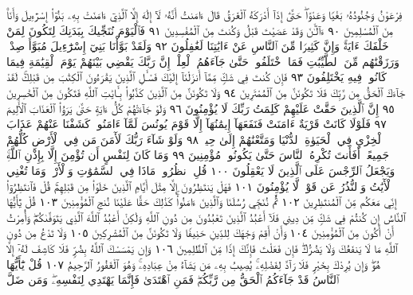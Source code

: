 فِرْعَوْنُ وَجُنُودُهُۥ بَغْيࣰا وَعَدْوًاۖ حَتَّىٰٓ إِذَآ أَدْرَكَهُ ٱلْغَرَقُ
قَالَ ءَامَنتُ أَنَّهُۥ لَآ إِلَٰهَ إِلَّا ٱلَّذِيٓ ءَامَنَتْ بِهِۦ بَنُوٓا۟ إِسْرَٰٓءِيلَ
وَأَنَا۠ مِنَ ٱلْمُسْلِمِينَ ٩٠ ءَآلْـَٰٔنَ وَقَدْ عَصَيْتَ قَبْلُ وَكُنتَ
مِنَ ٱلْمُفْسِدِينَ ٩١ فَٱلْيَوْمَ نُنَجِّيكَ بِبَدَنِكَ لِتَكُونَ لِمَنْ
خَلْفَكَ ءَايَةࣰۚ وَإِنَّ كَثِيرࣰا مِّنَ ٱلنَّاسِ عَنْ ءَايَٰتِنَا لَغَٰفِلُونَ ٩٢
وَلَقَدْ بَوَّأْنَا بَنِيٓ إِسْرَٰٓءِيلَ مُبَوَّأَ صِدْقࣲ وَرَزَقْنَٰهُم مِّنَ
ٱلطَّيِّبَٰتِ فَمَا ٱخْتَلَفُوا۟ حَتَّىٰ جَآءَهُمُ ٱلْعِلْمُۚ إِنَّ رَبَّكَ يَقْضِي
بَيْنَهُمْ يَوْمَ ٱلْقِيَٰمَةِ فِيمَا كَانُوا۟ فِيهِ يَخْتَلِفُونَ ٩٣ فَإِن كُنتَ فِي شَكࣲّ
مِّمَّآ أَنزَلْنَآ إِلَيْكَ فَسْـَٔلِ ٱلَّذِينَ يَقْرَءُونَ ٱلْكِتَٰبَ مِن
قَبْلِكَۚ لَقَدْ جَآءَكَ ٱلْحَقُّ مِن رَّبِّكَ فَلَا تَكُونَنَّ مِنَ ٱلْمُمْتَرِينَ ٩٤
وَلَا تَكُونَنَّ مِنَ ٱلَّذِينَ كَذَّبُوا۟ بِـَٔايَٰتِ ٱللَّهِ فَتَكُونَ مِنَ ٱلْخَٰسِرِينَ ٩٥
إِنَّ ٱلَّذِينَ حَقَّتْ عَلَيْهِمْ كَلِمَتُ رَبِّكَ لَا يُؤْمِنُونَ ٩٦
وَلَوْ جَآءَتْهُمْ كُلُّ ءَايَةٍ حَتَّىٰ يَرَوُا۟ ٱلْعَذَابَ ٱلْأَلِيمَ ٩٧
فَلَوْلَا كَانَتْ قَرْيَةٌ ءَامَنَتْ فَنَفَعَهَآ إِيمَٰنُهَآ إِلَّا قَوْمَ يُونُسَ
لَمَّآ ءَامَنُوا۟ كَشَفْنَا عَنْهُمْ عَذَابَ ٱلْخِزْيِ فِي ٱلْحَيَوٰةِ ٱلدُّنْيَا
وَمَتَّعْنَٰهُمْ إِلَىٰ حِينࣲ ٩٨ وَلَوْ شَآءَ رَبُّكَ لَأٓمَنَ مَن فِي ٱلْأَرْضِ
كُلُّهُمْ جَمِيعًاۚ أَفَأَنتَ تُكْرِهُ ٱلنَّاسَ حَتَّىٰ يَكُونُوا۟ مُؤْمِنِينَ ٩٩
وَمَا كَانَ لِنَفْسٍ أَن تُؤْمِنَ إِلَّا بِإِذْنِ ٱللَّهِۚ وَيَجْعَلُ ٱلرِّجْسَ
عَلَى ٱلَّذِينَ لَا يَعْقِلُونَ ١٠٠ قُلِ ٱنظُرُوا۟ مَاذَا فِي ٱلسَّمَٰوَٰتِ
وَٱلْأَرْضِۚ وَمَا تُغْنِي ٱلْأٓيَٰتُ وَٱلنُّذُرُ عَن قَوْمࣲ لَّا يُؤْمِنُونَ ١٠١
فَهَلْ يَنتَظِرُونَ إِلَّا مِثْلَ أَيَّامِ ٱلَّذِينَ خَلَوْا۟ مِن قَبْلِهِمْۚ
قُلْ فَٱنتَظِرُوٓا۟ إِنِّي مَعَكُم مِّنَ ٱلْمُنتَظِرِينَ ١٠٢ ثُمَّ نُنَجِّي
رُسُلَنَا وَٱلَّذِينَ ءَامَنُوا۟ۚ كَذَٰلِكَ حَقًّا عَلَيْنَا نُنجِ ٱلْمُؤْمِنِينَ ١٠٣
قُلْ يَٰٓأَيُّهَا ٱلنَّاسُ إِن كُنتُمْ فِي شَكࣲّ مِّن دِينِي فَلَآ أَعْبُدُ ٱلَّذِينَ
تَعْبُدُونَ مِن دُونِ ٱللَّهِ وَلَٰكِنْ أَعْبُدُ ٱللَّهَ ٱلَّذِي يَتَوَفَّىٰكُمْۖ وَأُمِرْتُ
أَنْ أَكُونَ مِنَ ٱلْمُؤْمِنِينَ ١٠٤ وَأَنْ أَقِمْ وَجْهَكَ لِلدِّينِ حَنِيفࣰا
وَلَا تَكُونَنَّ مِنَ ٱلْمُشْرِكِينَ ١٠٥ وَلَا تَدْعُ مِن دُونِ ٱللَّهِ مَا لَا
يَنفَعُكَ وَلَا يَضُرُّكَۖ فَإِن فَعَلْتَ فَإِنَّكَ إِذࣰا مِّنَ ٱلظَّٰلِمِينَ ١٠٦
وَإِن يَمْسَسْكَ ٱللَّهُ بِضُرࣲّ فَلَا كَاشِفَ لَهُۥٓ إِلَّا هُوَۖ وَإِن يُرِدْكَ
بِخَيْرࣲ فَلَا رَآدَّ لِفَضْلِهِۦۚ يُصِيبُ بِهِۦ مَن يَشَآءُ مِنْ عِبَادِهِۦۚ
وَهُوَ ٱلْغَفُورُ ٱلرَّحِيمُ ١٠٧ قُلْ يَٰٓأَيُّهَا ٱلنَّاسُ قَدْ جَآءَكُمُ ٱلْحَقُّ
مِن رَّبِّكُمْۖ فَمَنِ ٱهْتَدَىٰ فَإِنَّمَا يَهْتَدِي لِنَفْسِهِۦۖ وَمَن ضَلَّ
